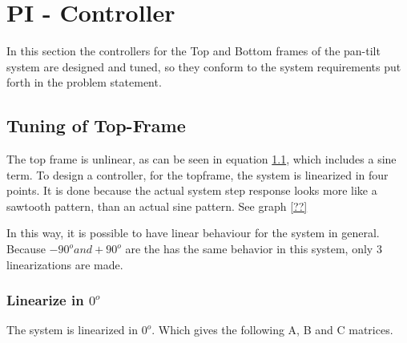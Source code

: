 \documentclass[../../../Main]{subfiles}
\begin{document}
\section{PI - Controller}
In this section the controllers for the Top and Bottom frames of the pan-tilt system are designed and tuned, so they conform to the system requirements put forth in the problem statement.

\subsection{Tuning of Top-Frame}

The top frame is unlinear, as can be seen in equation \ref{}, which includes a sine term.
To design a controller, for the topframe, the system is linearized in four points. It is done because the actual system step response looks more like a sawtooth pattern, than an actual sine pattern. See graph \ref{??}

In this way, it is possible to have linear behaviour for the system in general.
Because $-90^o and +90^o$ are the has the same behavior in this system, only 3 linearizations are made.

\subsubsection{Linearize in $0^o$}
\label{sec:linearize}
The system is linearized in $0^o$. Which gives the following A, B and C matrices. 
\end{document}
